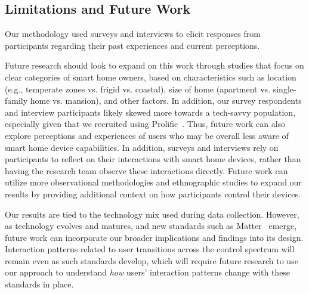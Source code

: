 \subsection{Limitations and Future Work}
\label{cic:sec:limitations}
Our methodology used surveys and interviews to elicit responses from participants regarding their past experiences and current perceptions. 

Future research should look to expand on this work through studies that focus on clear categories of smart home owners, based on characteristics such as location (e.g., temperate zones vs. frigid vs. coastal), size of home (apartment vs. single-family home vs. mansion), and other factors. In addition, our survey respondents and interview participants likely skewed more towards a tech-savvy population, especially given that we recruited using Prolific~\cite{abrokwa2021comparing}. Thus, future work can also explore perceptions and experiences of users who may be overall less aware of smart home device capabilities. 
In addition, surveys and interviews rely on participants to reflect on their interactions with smart home devices, rather than having the research team observe these interactions directly. Future work can utilize more observational methodologies and ethnographic studies to expand our results by providing additional context on how participants control their devices. 

Our results are tied to the technology mix used during data collection. However, as technology evolves and matures, and new standards such as Matter~\cite{matter} emerge, future work can incorporate our broader implications and findings into its design. Interaction patterns related to user transitions across the control spectrum will remain even as such standards develop, which will require future research to use our approach to understand \textit{how} users' interaction patterns change with these standards in place.

